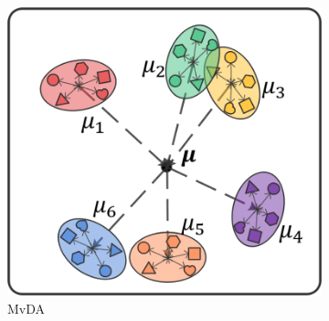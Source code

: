         \begin{figure}[htbp]
            \centering
            \begin{subfigure}{0.3\textwidth}
                \centering
                \includegraphics[width=0.95\linewidth]{figs/MvDA.png}
                \caption{MvDA}
            \end{subfigure}%
            \begin{subfigure}{0.15\textwidth}
                \centering

\end{subfigure}
\end{figure}

